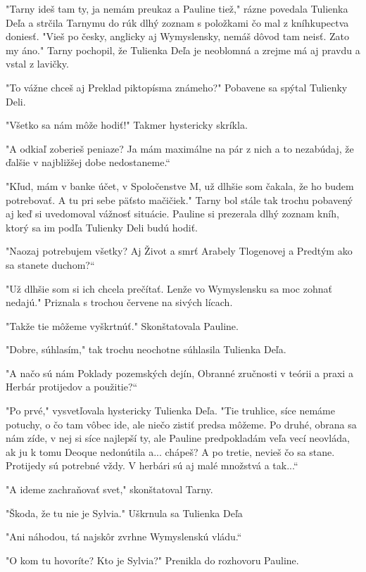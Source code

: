 \documentclass{book}
\begin{document}
"$ $Tarny ideš tam ty, ja nemám preukaz a Pauline tiež,"$ $ rázne povedala Tulienka Deľa a strčila Tarnymu do rúk dlhý zoznam s položkami čo mal z kníhkupectva doniesť. "$ $Vieš po česky, anglicky aj Wymyslensky, nemáš dôvod tam neisť. Zato my áno."$ $ Tarny pochopil, že Tulienka Deľa je neoblomná a zrejme má aj pravdu a vstal z lavičky.

"$ $To vážne chceš aj Preklad piktopísma známeho?"$ $ Pobavene sa spýtal Tulienky Deli.

"$ $Všetko sa nám môže hodiť!"$ $ Takmer hystericky skríkla.

"$ $A odkiaľ zoberieš peniaze? Ja mám maximálne na pár z nich a to nezabúdaj, že ďalšie v najbližšej dobe nedostaneme.“

"$ $Kľud, mám v banke účet, v Spoločenstve M, už dlhšie som čakala, že ho budem potrebovať. A tu pri sebe päťsto mačičiek."$ $ Tarny bol stále tak trochu pobavený aj keď si uvedomoval vážnosť situácie. Pauline si prezerala dlhý zoznam kníh, ktorý sa im podľa Tulienky Deli budú hodiť.

"$ $Naozaj potrebujem všetky? Aj Život a smrť Arabely Tlogenovej a Predtým ako sa stanete duchom?“

"$ $Už dlhšie som si ich chcela prečítať. Lenže vo Wymyslensku sa moc zohnať nedajú."$ $ Priznala s trochou červene na sivých lícach.

"$ $Takže tie môžeme vyškrtnúť."$ $ Skonštatovala Pauline.

"$ $Dobre, súhlasím,"$ $ tak trochu neochotne súhlasila Tulienka Deľa.

"$ $A načo sú nám Poklady pozemských dejín, Obranné zručnosti v teórii a praxi a Herbár protijedov a použitie?“

"$ $Po prvé,"$ $ vysvetľovala hystericky Tulienka Deľa. "$ $Tie truhlice, síce nemáme potuchy, o čo tam vôbec ide, ale niečo zistiť predsa môžeme. Po druhé, obrana sa nám zíde, v nej si síce najlepší ty, ale Pauline predpokladám veľa vecí neovláda, ak ju k tomu Deoque nedonútila a... chápeš? A po tretie, nevieš čo sa stane. Protijedy sú potrebné vždy. V herbári sú aj malé množstvá a tak...“

"$ $A ideme zachraňovať svet,"$ $ skonštatoval Tarny.

"$ $Škoda, že tu nie je Sylvia."$ $ Uškrnula sa Tulienka Deľa

 "$ $Ani náhodou, tá najskôr zvrhne Wymyslenskú vládu.“

"$ $O kom tu hovoríte? Kto je Sylvia?"$ $ Prenikla do rozhovoru Pauline.
\end{document}
